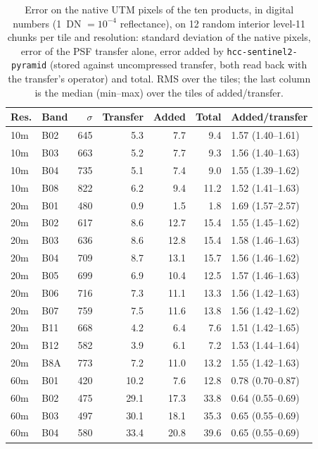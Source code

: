 \begin{table}[t]
\centering
\caption{Error on the native UTM pixels of the ten products, in digital numbers (1~DN $=10^{-4}$ reflectance), on 12 random interior level-11 chunks per tile and resolution: standard deviation of the native pixels, error of the PSF transfer alone, error added by \texttt{hcc-sentinel2-pyramid} (stored against uncompressed transfer, both read back with the transfer's operator) and total. RMS over the tiles; the last column is the median (min--max) over the tiles of added/transfer.}
\label{tab:operational_quality}
\small
\setlength{\tabcolsep}{3.5pt}
\begin{tabular}{llrrrrl}
\toprule
Res. & Band & $\sigma$ & Transfer & Added & Total & Added/transfer \\
\midrule
10m & B02 & 645 & 5.3 & 7.7 & 9.4 & 1.57 (1.40--1.61) \\
10m & B03 & 663 & 5.2 & 7.7 & 9.3 & 1.56 (1.40--1.63) \\
10m & B04 & 735 & 5.1 & 7.4 & 9.0 & 1.55 (1.39--1.62) \\
10m & B08 & 822 & 6.2 & 9.4 & 11.2 & 1.52 (1.41--1.63) \\
\midrule
20m & B01 & 480 & 0.9 & 1.5 & 1.8 & 1.69 (1.57--2.57) \\
20m & B02 & 617 & 8.6 & 12.7 & 15.4 & 1.55 (1.45--1.62) \\
20m & B03 & 636 & 8.6 & 12.8 & 15.4 & 1.58 (1.46--1.63) \\
20m & B04 & 709 & 8.7 & 13.1 & 15.7 & 1.56 (1.46--1.62) \\
20m & B05 & 699 & 6.9 & 10.4 & 12.5 & 1.57 (1.46--1.63) \\
20m & B06 & 716 & 7.3 & 11.1 & 13.3 & 1.56 (1.42--1.63) \\
20m & B07 & 759 & 7.5 & 11.6 & 13.8 & 1.56 (1.42--1.62) \\
20m & B11 & 668 & 4.2 & 6.4 & 7.6 & 1.51 (1.42--1.65) \\
20m & B12 & 582 & 3.9 & 6.1 & 7.2 & 1.53 (1.44--1.64) \\
20m & B8A & 773 & 7.2 & 11.0 & 13.2 & 1.55 (1.42--1.63) \\
\midrule
60m & B01 & 420 & 10.2 & 7.6 & 12.8 & 0.78 (0.70--0.87) \\
60m & B02 & 475 & 29.1 & 17.3 & 33.8 & 0.64 (0.55--0.69) \\
60m & B03 & 497 & 30.1 & 18.1 & 35.3 & 0.65 (0.55--0.69) \\
60m & B04 & 580 & 33.4 & 20.8 & 39.6 & 0.65 (0.55--0.69) \\

\end{tabular}
\end{table}
